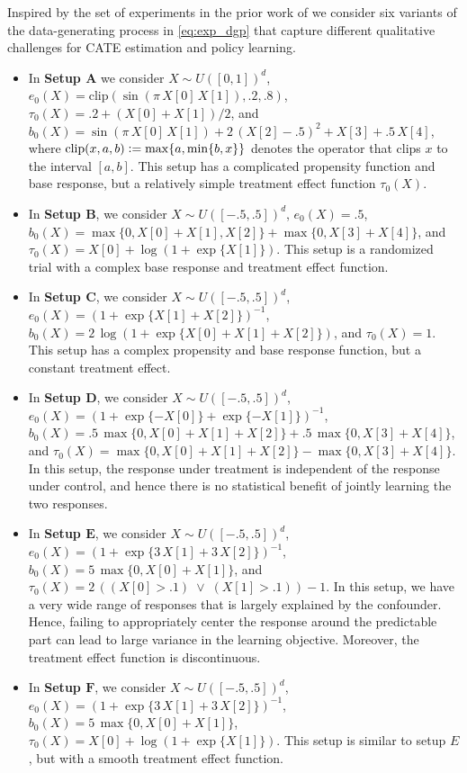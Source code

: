 \documentclass[11pt]{article} %
\newcommand{\pref}[1]{\cref{#1}}
\theoremstyle{theorem}  %
\theoremstyle{plain}
\newcommand{\ldef}{\vcentcolon=}
\newcommand{\mb}[1]{\boldsymbol{#1}}
\begin{document}
Inspired by the set of experiments in the prior work of \cite{nie2017quasi,athey2017efficient} we consider six variants of the data-generating process in \pref{eq:exp_dgp} that capture different qualitative challenges for CATE estimation and policy learning.
%
\begin{itemize}
\item In {\bf Setup $\mb{A}$} we consider $X\sim U([0, 1])^d$, $e_0(X)=\text{clip}(\sin(\pi\, X[0]\, X[1]), .2, .8)$, $\tau_0(X)=.2 + \left(X[0] + X[1]\right)/2$, and $b_0(X)=\sin(\pi\, X[0]\, X[1]) + 2\,(X[2] - .5)^2 + X[3] + .5\, X[4]$, where $\text{clip}(x, a, b)\ldef \max\{a, \min\{b, x\}\}$ denotes the operator that clips $x$ to the interval $[a, b]$. This setup has a complicated propensity function and base response, but a relatively simple treatment effect function $\tau_0(X)$.
\item In {\bf Setup $\mb{B}$}, we consider $X\sim U([-.5, .5])^d$, $e_0(X)=.5$, $b_0(X)=\max\{0, X[0] + X[1], X[2]\} + \max\{0, X[3]+X[4]\}$, and $\tau_0(X)=X[0] + \log(1 + \exp\{X[1]\})$. This setup is a randomized trial with a complex base response and treatment effect function.
\item In {\bf Setup $\mb{C}$}, we consider $X\sim U([-.5, .5])^d$, $e_0(X)=\left(1 + \exp\{X[1] + X[2]\}\right)^{-1}$, $b_0(X)=2\, \log(1 + \exp\{X[0] + X[1] + X[2]\})$, and $\tau_0(X)=1$. This setup has a complex propensity and base response function, but a constant treatment effect.
\item In {\bf Setup $\mb{D}$}, we consider $X\sim U([-.5, .5])^d$, $e_0(X)=\left(1 + \exp\{-X[0]\} + \exp\{-X[1]\}\right)^{-1}$, $b_0(X)= .5\, \max\{0, X[0]+X[1]+X[2]\} + .5\, \max\{0, X[3] + X[4]\}$, and $\tau_0(X)=\max\{0, X[0]+X[1]+X[2]\} - \max\{0, X[3]+X[4]\}$. In this setup, the response under treatment is independent of the response under control, and hence there is no statistical benefit of jointly learning the two responses.
\item In {\bf Setup $\mb{E}$}, we consider $X\sim U([-.5, .5])^d$, $e_0(X)=\left(1 + \exp\{3\,X[1] + 3\, X[2]\}\right)^{-1}$, $b_0(X)=5\, \max\{0, X[0] + X[1]\}$, and $\tau_0(X)=2\, ((X[0]>.1)\;\vee\;(X[1] > .1)) - 1$. In this setup, we have a very wide range of responses that is largely explained by the confounder. Hence, failing to appropriately center the response around the predictable part can lead to large variance in the learning objective. Moreover, the treatment effect function is discontinuous.
  \item In {\bf Setup $\mb{F}$}, we consider $X\sim U([-.5, .5])^d$, $e_0(X)=\left(1 + \exp\{3\,X[1] + 3\, X[2]\}\right)^{-1}$, $b_0(X)=5\, \max\{0, X[0] + X[1]\}$, $\tau_0(X)=X[0] + \log(1 + \exp\{X[1]\})$. This setup is similar to setup $E$, but with a smooth treatment effect function.
\end{itemize}
%
\end{document}
